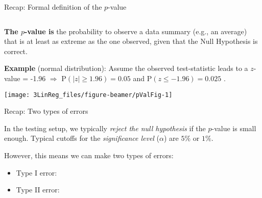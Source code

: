 \documentclass[10pt,ignorenonframetext,]{beamer}
\begin{document}
\begin{frame}

\begin{block}{Recap: Formal definition of the \(p\)-value}

\(~\)

\textbf{The \(p\)-value is} the probability to observe a data summary
(e.g., an average) that is at least as extreme as the one observed,
given that the Null Hypothesis is correct.

\vspace{3mm}

\textbf{Example} (normal distribution): Assume the observed
test-statistic leads to a \(z\)-value = -1.96 \(\Rightarrow\)
\(\text{P}(|z|\geq 1.96)=0.05\) and \(\text{P}(z\leq-1.96)=0.025\) .

\vspace{1mm}

\begin{center}\texttt{[image: 3LinReg\_files/figure-beamer/pValFig-1]} \end{center}

\end{block}

\end{frame}

\begin{frame}

\begin{block}{Recap: Two types of errors}

\vspace{2mm}

In the testing setup, we typically \emph{reject the null hypothesis} if
the \(p\)-value is small enough. Typical cutoffs for the
\emph{significance level} (\(\alpha\)) are \(5\%\) or \(1\%\).

\vspace{2mm}

However, this means we can make two types of errors: \vspace{2mm}

\begin{itemize}
\item
  Type I error:
\item
  Type II error:
\end{itemize}

\vspace{2mm}

\end{block}

\end{frame}
\end{document}
